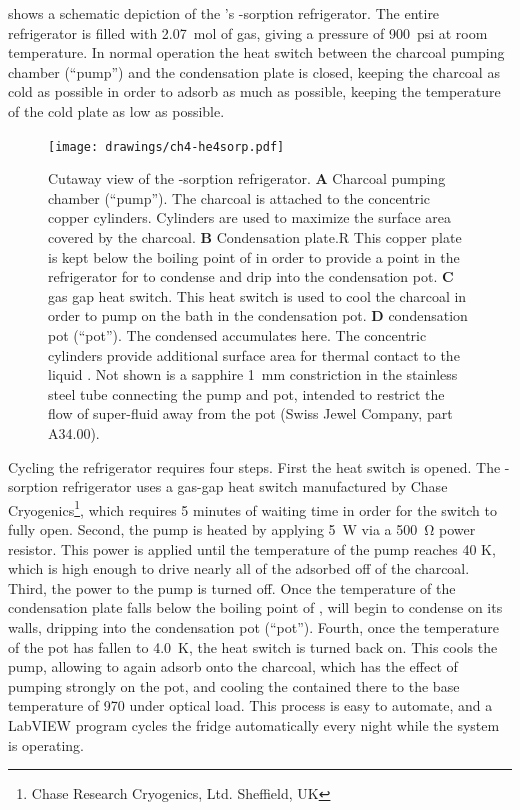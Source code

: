  shows a schematic depiction of the \Imager's -sorption refrigerator.
The entire refrigerator is filled with \SI{2.07}{\mole} of  gas, giving a pressure of \SI{900}{psi} at room temperature.
In normal operation the heat switch between the charcoal pumping chamber (``pump'') and the  condensation plate is closed, keeping the charcoal as cold as possible in order to adsorb as much  as possible, keeping the temperature of the cold plate as low as possible.

\begin{figure}
\centering
\texttt{[image: drawings/ch4-he4sorp.pdf]}
\caption[Cutaway view of the -sorption refrigerator]{
  Cutaway view of the -sorption refrigerator.
  \textbf{A} Charcoal pumping chamber (``pump'').
  The charcoal is attached to the concentric copper cylinders.
  Cylinders are used to maximize the surface area covered by the charcoal.
  \textbf{B} Condensation plate.R
  This copper plate is kept below the boiling point of  in order to provide a point in the refrigerator for  to condense and drip into the condensation pot.
  \textbf{C}  gas gap heat switch.
  This heat switch is used to cool the charcoal in order to pump on the  bath in the condensation pot. \textbf{D}  condensation pot (``pot'').
  The condensed  accumulates here.
  The concentric cylinders provide additional surface area for thermal contact to the liquid .
  Not shown is a sapphire \SI{1}{\mm} constriction in the stainless steel tube connecting the pump and pot, intended to restrict the flow of super-fluid  away from the pot (Swiss Jewel Company, part A34.00).
}
\label{fig:he4sorp}
\end{figure}

Cycling the refrigerator requires four steps.
First the heat switch is opened.
The -sorption refrigerator uses a  gas-gap heat switch manufactured by Chase Cryogenics\footnote{Chase Research Cryogenics, Ltd. Sheffield, UK}, which requires 5 minutes of waiting time in order for the switch to fully open.
Second, the pump is heated by applying \SI{5}{\W} via a \SI{500}{\ohm} power resistor.
This power is applied until the temperature of the pump reaches 40 K, which is high enough to drive nearly all of the adsorbed  off of the charcoal.
Third, the power to the pump is turned off.
Once the temperature of the condensation plate falls below the boiling point of ,  will begin to condense on its walls, dripping into the  condensation pot (``pot'').
Fourth, once the temperature of the pot has fallen to \SI{4.0}{\K}, the heat switch is turned back on.
This cools the pump, allowing  to again adsorb onto the charcoal, which has the effect of pumping strongly on the pot, and cooling the  contained there to the base temperature of \SI{970}{\mK} under optical load.
This process is easy to automate, and a LabVIEW program cycles the fridge automatically every night while the system is operating.

